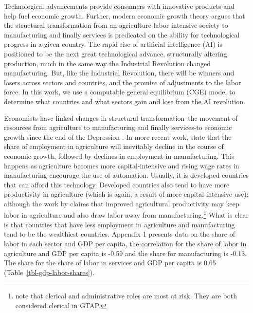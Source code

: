 \documentclass[
  authoryear,
  doubleblind]{elsarticle}
\begin{document}
Technological advancements provide consumers with innovative products
and help fuel economic growth. Further, modern economic growth theory
argues that the structural transformation from an agriculture-labor
intensive society to manufacturing and finally services is predicated on
the ability for technological progress in a given country. The rapid
rise of artificial intelligence (AI) is positioned to be the next great
technological advance, structurally altering production, much in the
same way the Industrial Revolution changed manufacturing. But, like the
Industrial Revolution, there will be winners and losers across sectors
and countries, and the promise of adjustments to the labor force. In
this work, we use a computable general equilibrium (CGE) model to
determine what countries and what sectors gain and lose from the AI
revolution.

Economists have linked changes in structural transformation--the
movement of resources from agriculture to manufacturing and finally
services-to economic growth since the end of the Depression \citep[see
e.g.,][]{clark1940, fisher1939, kuznets1966}. In more recent work,
\citet{anderson2023} state that the share of employment in agriculture
will inevitably decline in the course of economic growth, followed by
declines in employment in manufacturing. This happens as agriculture
becomes more capital-intensive and rising wage rates in manufacturing
encourage the use of automation. Usually, it is developed countries that
can afford this technology. Developed countries also tend to have more
productivity in agriculture (which is again, a result of more
capital-intensive use); although the work by \citet{gangopadhyay2021}
claims that improved agricultural productivity may keep labor in
agriculture and also draw labor away from manufacturing.\footnote{\citet{manning2026}
  note that clerical and administrative roles are most at risk. They are
  both considered clerical in GTAP.} What is clear is that countries
that have less employment in agriculture and manufacturing tend to be
the wealthiest countries. Appendix 1 presents data on the share of labor
in each sector and GDP per capita, the correlation for the share of
labor in agriculture and GDP per capita is -0.59 and the share for
manufacturing is -0.13. The share for the share of labor in services and
GDP per capita is 0.65 (Table~\ref{tbl-gdp-labor-shares}).
\end{document}
